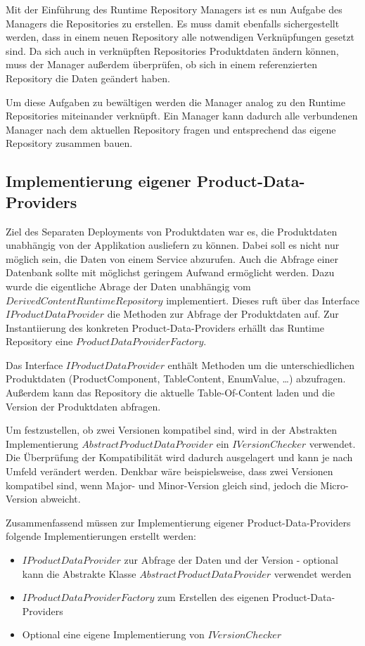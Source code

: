 \documentclass[headsepline=true, footsepline=true]{scrartcl}
\begin{document}
Mit der Einführung des Runtime Repository Managers ist es nun Aufgabe des
Managers die Repositories zu erstellen. Es muss damit ebenfalls sichergestellt
werden, dass in einem neuen Repository alle notwendigen Verknüpfungen gesetzt
sind. Da sich auch in verknüpften Repositories Produktdaten ändern können, muss
der Manager außerdem überprüfen, ob sich in einem referenzierten Repository die
Daten geändert haben.

Um diese Aufgaben zu bewältigen werden die Manager analog zu den Runtime
Repositories miteinander verknüpft. Ein Manager kann dadurch alle verbundenen
Manager nach dem aktuellen Repository fragen und entsprechend das eigene
Repository zusammen bauen.

\subsection{Implementierung eigener Product-Data-Providers}

Ziel des Separaten Deployments von Produktdaten war es, die Produktdaten
unabhängig von der Applikation ausliefern zu können. Dabei soll es nicht nur
möglich sein, die Daten von einem Service abzurufen. Auch die Abfrage einer
Datenbank sollte mit möglichst geringem Aufwand ermöglicht werden. Dazu wurde die
eigentliche Abrage der Daten unabhängig vom $DerivedContentRuntimeRepository$
implementiert. Dieses ruft über das Interface $IProductDataProvider$ die
Methoden zur Abfrage der Produktdaten auf. Zur Instantiierung des konkreten
Product-Data-Providers erhällt das Runtime Repository eine
$ProductDataProviderFactory$.

Das Interface $IProductDataProvider$ enthält Methoden um die unterschiedlichen
Produktdaten (ProductComponent, TableContent, EnumValue, \ldots) abzufragen.
Außerdem kann das Repository die aktuelle Table-Of-Content laden und die Version
der Produktdaten abfragen.

Um festzustellen, ob zwei Versionen kompatibel sind, wird in der Abstrakten
Implementierung $AbstractProductDataProvider$ ein $IVersionChecker$ verwendet.
Die Überprüfung der Kompatibilität wird dadurch ausgelagert und kann je nach
Umfeld verändert werden. Denkbar wäre beispielsweise, dass zwei Versionen
kompatibel sind, wenn Major- und Minor-Version gleich sind, jedoch die
Micro-Version abweicht.

Zusammenfassend müssen zur Implementierung eigener Product-Data-Providers
folgende Implementierungen erstellt werden:

\begin{itemize}
	\item $IProductDataProvider$ zur Abfrage der Daten und der Version - optional
	kann die Abstrakte Klasse $AbstractProductDataProvider$ verwendet werden
	\item $IProductDataProviderFactory$ zum Erstellen des eigenen
	Product-Data-Providers
	\item Optional eine eigene Implementierung von $IVersionChecker$
\end{itemize}



\end{document}
